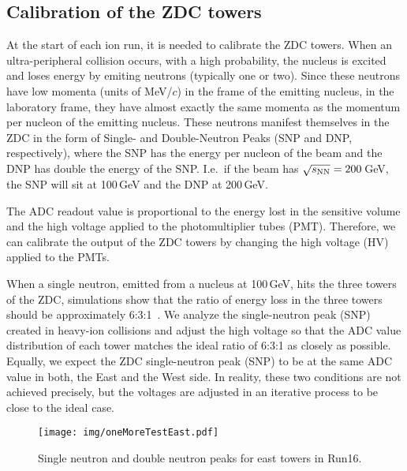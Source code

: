 \subsection{Calibration of the ZDC towers\label{ZDCcalibration}}
At the start of each ion run, it is needed to calibrate the ZDC towers. When an ultra-peripheral
collision occurs, with a high probability, the nucleus is excited and loses energy by emiting neutrons
(typically one or two). Since these neutrons have low momenta (units of MeV/$c$) in the frame of the emitting nucleus, in the laboratory frame, they have almost exactly the same momenta as the momentum per nucleon of the emitting nucleus. These neutrons manifest themselves in the ZDC in the form of Single- and Double-Neutron Peaks
(SNP and DNP, respectively),
where the SNP has the energy per nucleon of the beam and the DNP has double the energy of the SNP\@. I.e.\ if
the beam has $\sqrt{s_\text{NN}} = 200\,$GeV, the SNP will sit at 100$\,$GeV and the DNP at 200$\,$GeV\@.

The ADC readout value is proportional to the energy lost in the sensitive volume and the high voltage applied to the
photomultiplier tubes (PMT)\@. Therefore, we can calibrate the output of the ZDC towers by changing the high voltage (HV) applied to the PMTs. 

When a single neutron, emitted from a nucleus at 100$\,$GeV, hits the three towers of the ZDC, simulations show that the ratio of energy loss
in the three towers should be 
approximately 6:3:1~\cite{ZDCphysics}\@. We analyze the single-neutron peak (SNP) created in heavy-ion collisions and adjust the high voltage so that the ADC value 
distribution of each tower matches the ideal ratio of 6:3:1 as closely as possible. Equally, we expect the ZDC 
single-neutron peak (SNP) to
be at the same ADC value in both, the East and the West side. In reality, these two conditions are not achieved precisely, but the voltages are adjusted in an iterative process to be close to the ideal case.

\begin{figure}[htb]
\begin{center}
\texttt{[image: img/oneMoreTestEast.pdf]}
\end{center}
\caption{\label{SNPillustration} Single neutron and double neutron peaks for east towers in Run16.}

\end{figure}

